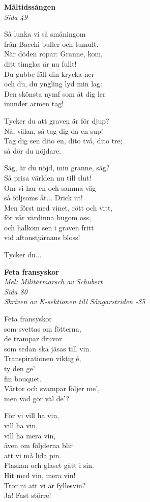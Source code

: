 \documentclass[10pt]{article}
\newenvironment{song}[2]{
	\textbf{#1}\\
	\emph{#2}\par
	\vspace{-1mm}
}{
	\vspace{2mm}
}
\begin{document}
\begin{multicols*}{2}

\begin{song}{Måltidssången}{Sida 49}
	Så lunka vi så småningom\\
	från Bacchi buller och tumult.\\
	När döden ropar: Granne, kom,\\
	ditt timglas är nu fullt!\\
	Du gubbe fäll din krycka ner\\
	och du, du yngling lyd min lag:\\
	Den skönsta nymf som åt dig ler\\
	inunder armen tag!

	Tycker du att graven är för djup?\\
	Nå, välan, så tag dig då en sup!\\
	Tag dig sen dito en, dito två, dito tre;\\
	så dör du nöjdare.

	Säg, är du nöjd, min granne, säg?\\
	Så prisa världen nu till slut!\\
	Om vi har en och samma väg\\
	så följsoms åt... Drick ut!\\
	Men först med vinet, rött och vitt,\\
	för vår värdinna bugom oss,\\
	och halkom sen i graven fritt\\
	vid aftonstjärnans bloss!

	Tycker du...
\end{song}

\begin{song}{Feta fransyskor}{Mel: Militärmarsch av Schubert\\Sida 80\\Skriven av K-sektionen till Sångarstriden -85}
	Feta fransyskor\\
	som svettas om fötterna,\\
	de trampar druvor\\
	som sedan ska jäsas till vin.\\
	Transpirationen viktig é,\\
	ty den ge’\\
	fin bouquet.\\
	Vårtor och svampar följer me’,\\
	men vad gör väl de’?

	För vi vill ha vin,\\
	vill ha vin,\\
	vill ha mera vin,\\
	även om följderna blir\\
	att vi må lida pin.\\
	Flaskan och glaset gått i sin.\\
	Hit med vin, mera vin!\\
	Tror ni att vi är fyllesvin?\\
	Ja! Fast större!
\end{song}


\end{multicols*}
\end{document}
